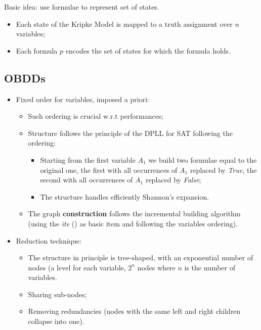 Basic idea: use formulae to represent set of states.
\begin{itemize}

    \item   Each state of the Kripke Model is mapped to a truth assignment
            over $n$ variables;

    \item   Each formula $p$ encodes the set of states for which the
            formula holds.

\end{itemize}

\subsection{OBDDs}

    \begin{itemize}

    \item   Fixed order for variables, imposed a priori:
        \begin{itemize}

        \item   Such ordering is crucial w.r.t performances;

        \item   Structure follows the principle of the DPLL for SAT
                following the ordering:

            \begin{itemize}
            \item   Starting from the first variable $A_1$ we build two
                    formulae equal to the original one, the first with all
                    occurrences of $A_1$ replaced by \emph{True}, the
                    second with all occurrences of $A_1$ replaced by
                    \emph{False};
            \item   The structure handles efficiently Shannon's expansion.
            \end{itemize}

        \item   The graph {\bf construction} follows the incremental
                building algorithm (using the \emph{ite}
                () as basic item and following
                the variables ordering).

        \end{itemize}

    \item   Reduction technique:
        \begin{itemize}
        \item   The structure in principle is tree-shaped, with an
                exponential number of nodes (a level for each variable,
                $2^n$ nodes where $n$ is the number of variables.
        \item   Sharing sub-nodes;
        \item   Removing redundancies (nodes with the same left and right
                children collapse into one).
        \end{itemize}


\end{itemize}
